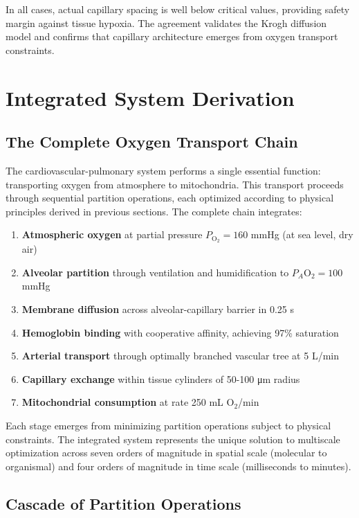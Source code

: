\documentclass[10pt,twocolumn,a4paper]{article}
\theoremstyle{remark}
\begin{document}
In all cases, actual capillary spacing is well below critical values, providing safety margin against tissue hypoxia. The agreement validates the Krogh diffusion model and confirms that capillary architecture emerges from oxygen transport constraints.

\section{Integrated System Derivation}
\label{sec:integrated}

\subsection{The Complete Oxygen Transport Chain}

The cardiovascular-pulmonary system performs a single essential function: transporting oxygen from atmosphere to mitochondria. This transport proceeds through sequential partition operations, each optimized according to physical principles derived in previous sections. The complete chain integrates:

\begin{enumerate}
\item \textbf{Atmospheric oxygen} at partial pressure $P_{\mathrm{O}_{2}} = 160$ mmHg (at sea level, dry air)
\item \textbf{Alveolar partition} through ventilation and humidification to $P_{A}\mathrm{O}_{2} = 100$ mmHg
\item \textbf{Membrane diffusion} across alveolar-capillary barrier in 0.25 s
\item \textbf{Hemoglobin binding} with cooperative affinity, achieving 97\% saturation
\item \textbf{Arterial transport} through optimally branched vascular tree at 5 L/min
\item \textbf{Capillary exchange} within tissue cylinders of 50-100 μm radius
\item \textbf{Mitochondrial consumption} at rate 250 mL O$_{2}$/min
\end{enumerate}

Each stage emerges from minimizing partition operations subject to physical constraints. The integrated system represents the unique solution to multiscale optimization across seven orders of magnitude in spatial scale (molecular to organismal) and four orders of magnitude in time scale (milliseconds to minutes).

\subsection{Cascade of Partition Operations}
\end{document}
